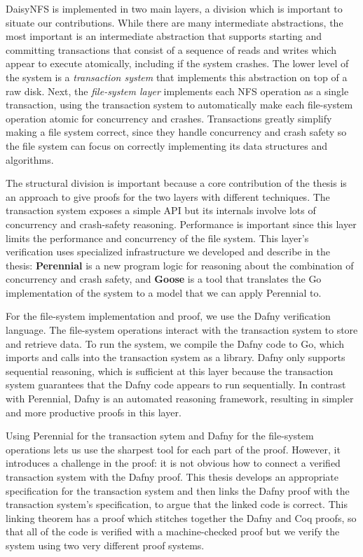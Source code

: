 
DaisyNFS is implemented in two main layers, a division which is important to
situate our contributions. While there are many intermediate abstractions, the
most important is an intermediate abstraction that supports starting and
committing transactions that consist of a sequence of reads and writes which
appear to execute atomically, including if the system crashes. The lower level
of the system is a \emph{transaction system} that implements this abstraction on
top of a raw disk. Next, the \emph{file-system layer} implements each NFS
operation as a single transaction, using the transaction system to automatically
make each file-system operation atomic for
concurrency and crashes. Transactions greatly simplify making a file
system correct, since they handle concurrency and crash safety so the
file system can focus on correctly implementing its data structures and
algorithms.

The structural division is important because a core contribution of the thesis
is an approach to give proofs for the two layers with different techniques.
The transaction
system exposes a simple API but its internals involve lots of
concurrency and crash-safety reasoning. Performance is important since
this layer limits the performance and concurrency of the file system.
This layer's verification uses specialized infrastructure we developed
and describe in the thesis: \textbf{Perennial} is a new program logic
for reasoning about the combination of concurrency and crash safety, and
\textbf{Goose} is a tool that translates the Go implementation of the
system to a model that we can apply Perennial to.

For the file-system implementation and proof, we use the Dafny
verification language. The file-system operations interact with the
transaction system to store and retrieve data. To run the system, we
compile the Dafny code to Go, which imports and calls into the
transaction system as a library. Dafny only supports sequential
reasoning, which is sufficient at this layer because the transaction
system guarantees that the Dafny code appears to run sequentially. In contrast
with Perennial, Dafny is an automated reasoning framework, resulting in simpler
and more productive proofs in this layer.

Using Perennial for the transaction sytem and Dafny for the file-system
operations lets us use the sharpest tool for each part of the proof. However, it
introduces a challenge in the proof: it is not obvious how to connect a verified
transaction system with the Dafny proof. This thesis develops an appropriate
specification for the transaction system and then links the Dafny proof with the
transaction system's specification, to
argue that the linked code is correct. This linking theorem has a proof which stitches together
the Dafny and Coq proofs, so that all of the code is verified with a
machine-checked proof but we verify the system using two very different proof
systems.


